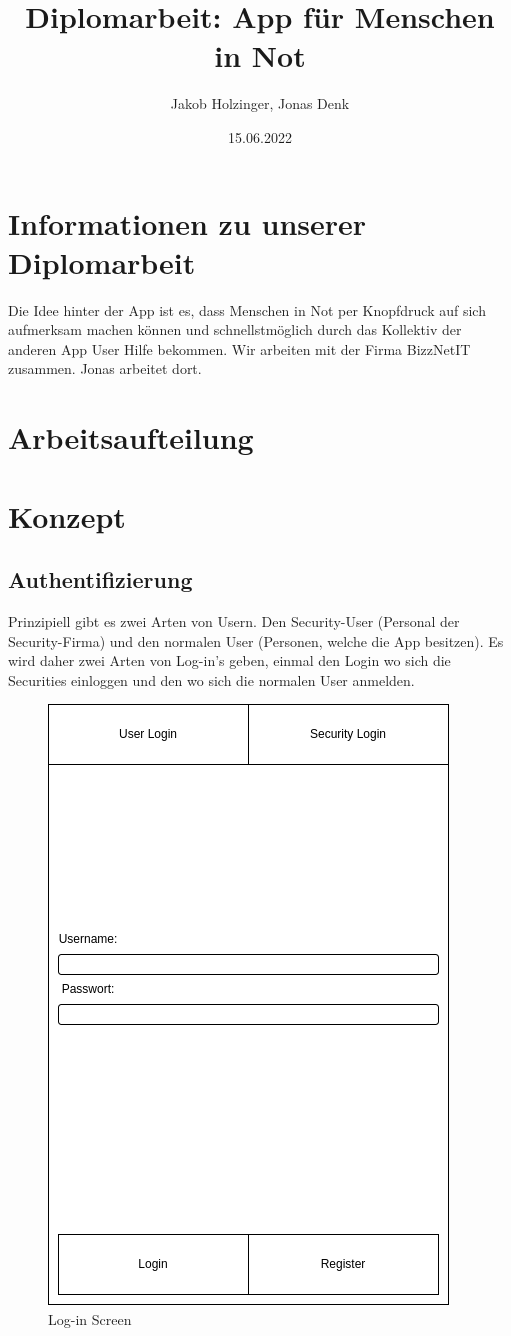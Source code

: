 \documentclass{article}
\title{Diplomarbeit: App für Menschen in Not}
\date{15.06.2022}
\author{Jakob Holzinger, Jonas Denk}
\begin{document}
\maketitle
\frenchspacing
\raggedbottom
\pagestyle{plain}
\section{Informationen zu unserer Diplomarbeit}
Die Idee hinter der App ist es, dass Menschen in Not per Knopfdruck auf sich aufmerksam machen können und schnellstmöglich durch das Kollektiv der anderen App User Hilfe bekommen.
Wir arbeiten mit der Firma BizzNetIT zusammen. Jonas arbeitet dort.
\section{Arbeitsaufteilung}
\section{Konzept}
\subsection{Authentifizierung}
Prinzipiell gibt es zwei Arten von Usern. Den Security-User (Personal der Security-Firma) und den normalen User (Personen, welche die App besitzen). Es wird daher zwei Arten von Log-in's geben, einmal den Login wo sich die Securities einloggen und den wo sich die normalen User anmelden. 
\begin{figure}[H] \includegraphics[scale=0.75]{login} \centering \caption{Log-in Screen} \end{figure}
\end{document}
